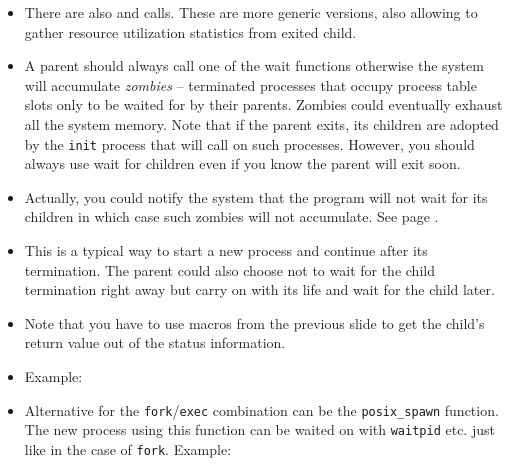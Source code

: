 \begin{itemize}
\item There are also  and  calls. These are more
generic versions, also allowing to gather resource utilization statistics from
exited child.
\item A parent should always call one of the wait functions otherwise the system
will accumulate \emph{zombies} -- terminated processes that occupy process table
slots only to be waited for by their parents.  Zombies could eventually exhaust
all the system memory.  Note that if the parent exits, its children are adopted
by the \texttt{init} process that will call  on such processes.
However, you should always use wait for children even if you know the parent
will exit soon.
\item Actually, you could notify the system that the program will not wait for
its children in which case such zombies will not accumulate.  See page
\pageref{IGNORE_SIG_CHLD}.
\end{itemize}


\begin{slide}
\begin{center}

\end{center}
\end{slide}

\begin{itemize}
\item This is a typical way to start a new process and continue after its
termination.  The parent could also choose not to wait for the child termination
right away but carry on with its life and wait for the child later.
\item Note that you have to use macros from the previous slide to get the
child's return value out of the status information.
\item \label{WAITPID} Example: 
\item \label{SPAWN} Alternative for the \texttt{fork}/\texttt{exec} combination
can be the \texttt{posix\_spawn} function. The new process using this function
can be waited on with \texttt{waitpid} etc. just like in the case of
\texttt{fork}. Example: 
\end{itemize}


\label{PIPEREADWRITE}


